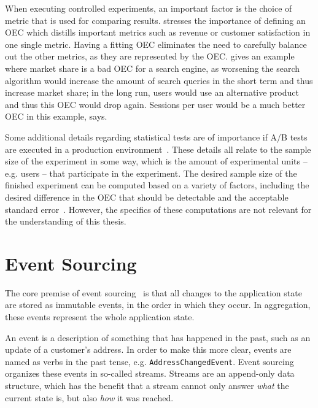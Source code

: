 When executing controlled experiments, an important factor is the choice of metric that is used for comparing results.
\citet{Kohavi2013a} stresses the importance of defining an \ac{OEC} which distills important metrics such as revenue or customer satisfaction in one single metric.
Having a fitting \ac{OEC} eliminates the need to carefully balance out the other metrics, as they are represented by the \ac{OEC}.
\citeauthor{Kohavi2013a} gives an example where market share is a bad \ac{OEC} for a search engine, as worsening the search algorithm would increase the amount of search queries in the short term and thus increase market share; in the long run, users would use an alternative product and thus this \ac{OEC} would drop again.
Sessions per user would be a much better \ac{OEC} in this example, \citeauthor{Kohavi2013a} says.

Some additional details regarding statistical tests are of importance if A/B tests are executed in a production environment~\cite{Kohavi2009}.
These details all relate to the sample size of the experiment in some way, which is the amount of experimental units -- e.g. users -- that participate in the experiment.
The desired sample size of the finished experiment can be computed based on a variety of factors, including the desired difference in the \ac{OEC} that should be detectable and the acceptable standard error~\cite{mason2003statistical}.
However, the specifics of these computations are not relevant for the understanding of this thesis.

\section{Event Sourcing}
\label{sec:fundamentals:event}

The core premise of event sourcing~\cite{WEB:Fowler:2005} is that all changes to the application state are stored as immutable events, in the order in which they occur.
In aggregation, these events represent the whole application state.

An event is a description of something that has happened in the past, such as an update of a customer's address.
In order to make this more clear, events are named as verbs in the past tense, e.g. \texttt{AddressChangedEvent}.
Event sourcing organizes these events in so-called streams.
Streams are an append-only data structure, which has the benefit that a stream cannot only answer \emph{what} the current state is, but also \emph{how} it was reached.

